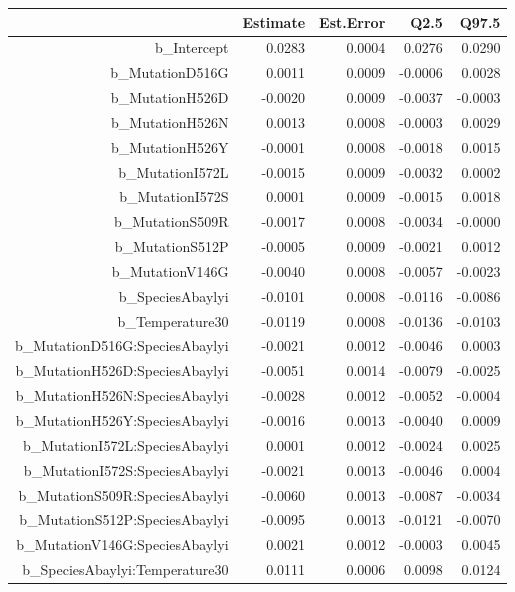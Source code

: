\begin{table}[ht]
\centering
\begingroup\footnotesize
\begin{tabular}{rrrrr}
  \hline
 & Estimate & Est.Error & Q2.5 & Q97.5 \\ 
  \hline
b\_Intercept & 0.0283 & 0.0004 & 0.0276 & 0.0290 \\ 
  b\_MutationD516G & 0.0011 & 0.0009 & -0.0006 & 0.0028 \\ 
  b\_MutationH526D & -0.0020 & 0.0009 & -0.0037 & -0.0003 \\ 
  b\_MutationH526N & 0.0013 & 0.0008 & -0.0003 & 0.0029 \\ 
  b\_MutationH526Y & -0.0001 & 0.0008 & -0.0018 & 0.0015 \\ 
  b\_MutationI572L & -0.0015 & 0.0009 & -0.0032 & 0.0002 \\ 
  b\_MutationI572S & 0.0001 & 0.0009 & -0.0015 & 0.0018 \\ 
  b\_MutationS509R & -0.0017 & 0.0008 & -0.0034 & -0.0000 \\ 
  b\_MutationS512P & -0.0005 & 0.0009 & -0.0021 & 0.0012 \\ 
  b\_MutationV146G & -0.0040 & 0.0008 & -0.0057 & -0.0023 \\ 
  b\_SpeciesAbaylyi & -0.0101 & 0.0008 & -0.0116 & -0.0086 \\ 
  b\_Temperature30 & -0.0119 & 0.0008 & -0.0136 & -0.0103 \\ 
  b\_MutationD516G:SpeciesAbaylyi & -0.0021 & 0.0012 & -0.0046 & 0.0003 \\ 
  b\_MutationH526D:SpeciesAbaylyi & -0.0051 & 0.0014 & -0.0079 & -0.0025 \\ 
  b\_MutationH526N:SpeciesAbaylyi & -0.0028 & 0.0012 & -0.0052 & -0.0004 \\ 
  b\_MutationH526Y:SpeciesAbaylyi & -0.0016 & 0.0013 & -0.0040 & 0.0009 \\ 
  b\_MutationI572L:SpeciesAbaylyi & 0.0001 & 0.0012 & -0.0024 & 0.0025 \\ 
  b\_MutationI572S:SpeciesAbaylyi & -0.0021 & 0.0013 & -0.0046 & 0.0004 \\ 
  b\_MutationS509R:SpeciesAbaylyi & -0.0060 & 0.0013 & -0.0087 & -0.0034 \\ 
  b\_MutationS512P:SpeciesAbaylyi & -0.0095 & 0.0013 & -0.0121 & -0.0070 \\ 
  b\_MutationV146G:SpeciesAbaylyi & 0.0021 & 0.0012 & -0.0003 & 0.0045 \\ 
  b\_SpeciesAbaylyi:Temperature30 & 0.0111 & 0.0006 & 0.0098 & 0.0124 \\ 

\end{tabular}
\end{table}
